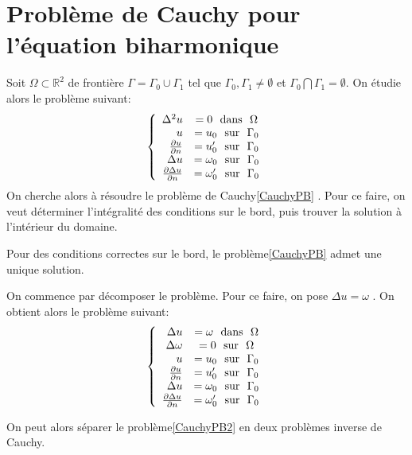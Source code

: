 \section{Problème de Cauchy pour l'équation biharmonique}\label{sec:problème-de-cauchy-pour-l'équation-biharmonique}

Soit $\Omega\subset\mathds{R}^2$ de frontière $\Gamma = \Gamma_0 \cup \Gamma_1$ tel que $\Gamma_0,\Gamma_1 \neq
\emptyset$ et $\Gamma_0 \bigcap \Gamma_1 = \emptyset$.
On étudie alors le problème suivant:
\begin{align}
	\label{CauchyPB}
	\left\{
	\begin{array}{r c l}
		\Delta^2u &= 0 ~\text{ dans }~ \Omega\\
		u&=u_0 ~\text{ sur }~ \Gamma_0\\
		\frac{\partial u}{\partial n} &= u^\prime_0 ~\text{ sur }~ \Gamma_0 \\
		\Delta u &= \omega_0 ~\text{ sur }~ \Gamma_0\\
		\frac{\partial\Delta u}{\partial n}&=\omega^\prime_0 ~\text{ sur }~ \Gamma_0
	\end{array}
	\right.
\end{align}
On cherche alors à résoudre le problème de Cauchy\ref{CauchyPB} .
Pour ce faire, on veut déterminer l'intégralité des conditions sur le bord, puis trouver la solution à l'intérieur du
domaine.

Pour des conditions correctes sur le bord, le problème\ref{CauchyPB} admet une unique solution.

On commence par décomposer le problème.
Pour ce faire, on pose $ \Delta u = \omega$ .
On obtient alors le problème suivant:
\begin{align}
	\label{CauchyPB2}
	\left\{
	\begin{array}{r c l}
		\Delta u &= \omega  ~\text{ dans }~ \Omega\\
		\Delta\omega&=0 ~\text{ sur }~ \Omega\\
		u&=u_0 ~\text{ sur }~ \Gamma_0\\
		\frac{\partial u}{\partial n} &= u^\prime_0 ~\text{ sur }~ \Gamma_0 \\
		\Delta u &= \omega_0 ~\text{ sur }~ \Gamma_0\\
		\frac{\partial\Delta u}{\partial n}&=\omega^\prime_0 ~\text{ sur }~ \Gamma_0
	\end{array}
	\right.
\end{align}

On peut alors séparer le problème\ref{CauchyPB2} en deux problèmes inverse de Cauchy.

